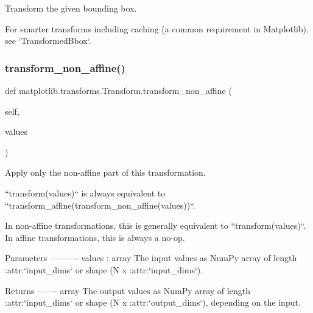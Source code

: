 \begin{DoxyVerb}Transform the given bounding box.

For smarter transforms including caching (a common requirement in
Matplotlib), see `TransformedBbox`.
\end{DoxyVerb}
 \mbox{\label{classmatplotlib_1_1transforms_1_1Transform_a3b6fee992defc1eff51988efbc5c1780}} 
\subsubsection{\texorpdfstring{transform\+\_\+non\+\_\+affine()}{transform\_non\_affine()}}
{\footnotesize\ttfamily def matplotlib.\+transforms.\+Transform.\+transform\+\_\+non\+\_\+affine (\begin{DoxyParamCaption}\item[{}]{self,  }\item[{}]{values }\end{DoxyParamCaption})}

\begin{DoxyVerb}Apply only the non-affine part of this transformation.

``transform(values)`` is always equivalent to
``transform_affine(transform_non_affine(values))``.

In non-affine transformations, this is generally equivalent to
``transform(values)``.  In affine transformations, this is
always a no-op.

Parameters
----------
values : array
    The input values as NumPy array of length :attr:`input_dims` or
    shape (N x :attr:`input_dims`).

Returns
-------
array
    The output values as NumPy array of length :attr:`input_dims` or
    shape (N x :attr:`output_dims`), depending on the input.
\end{DoxyVerb}
 \mbox{\label{classmatplotlib_1_1transforms_1_1Transform_a387a1221c1e91cd48b3c0bada34551ae}} 

